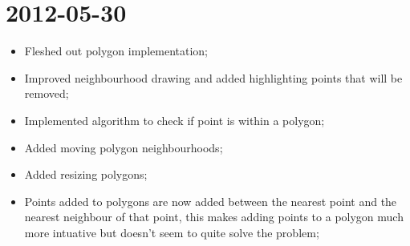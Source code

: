 \documentclass{report}
\begin{document}
\section*{2012-05-30}
\begin{itemize}
  \item 
    Fleshed out polygon implementation;
  \item
    Improved neighbourhood drawing and added highlighting points that will be removed;
  \item
    Implemented algorithm to check if point is within a polygon;
  \item
    Added moving polygon neighbourhoods;
  \item
    Added resizing polygons;
  \item
    Points added to polygons are now added between the nearest point and the nearest neighbour of that point, this makes adding points to a polygon much more intuative but doesn't seem to quite solve the problem;
\end{itemize}
\end{document}

